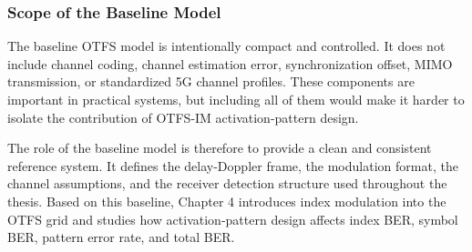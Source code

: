 \subsubsection{Scope of the Baseline Model}

The baseline OTFS model is intentionally compact and controlled. It does not include channel coding, channel estimation error, synchronization offset, MIMO transmission, or standardized 5G channel profiles. These components are important in practical systems, but including all of them would make it harder to isolate the contribution of OTFS-IM activation-pattern design.

The role of the baseline model is therefore to provide a clean and consistent reference system. It defines the delay-Doppler frame, the modulation format, the channel assumptions, and the receiver detection structure used throughout the thesis. Based on this baseline, Chapter 4 introduces index modulation into the OTFS grid and studies how activation-pattern design affects index BER, symbol BER, pattern error rate, and total BER.